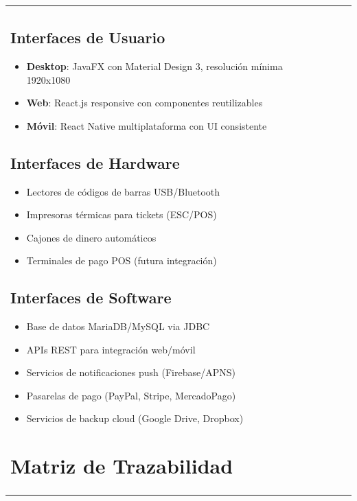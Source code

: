 \documentclass[12pt,letterpaper]{article}
\begin{document}
\begin{longtable}{|p{3cm}|p{2cm}|p{4cm}|p{6cm}|}
\subsection{Interfaces de Usuario}
\begin{itemize}
    \item \textbf{Desktop}: JavaFX con Material Design 3, resolución mínima 1920x1080
    \item \textbf{Web}: React.js responsive con componentes reutilizables
    \item \textbf{Móvil}: React Native multiplataforma con UI consistente
\end{itemize}

\subsection{Interfaces de Hardware}
\begin{itemize}
    \item Lectores de códigos de barras USB/Bluetooth
    \item Impresoras térmicas para tickets (ESC/POS)
    \item Cajones de dinero automáticos
    \item Terminales de pago POS (futura integración)
\end{itemize}

\subsection{Interfaces de Software}
\begin{itemize}
    \item Base de datos MariaDB/MySQL via JDBC
    \item APIs REST para integración web/móvil
    \item Servicios de notificaciones push (Firebase/APNS)
    \item Pasarelas de pago (PayPal, Stripe, MercadoPago)
    \item Servicios de backup cloud (Google Drive, Dropbox)
\end{itemize}

\section{Matriz de Trazabilidad}


\end{longtable}
\end{document}
